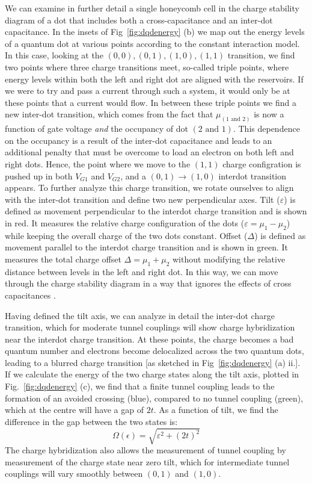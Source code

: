 We can examine in further detail a single honeycomb cell in the charge stability diagram of a dot that includes both a cross-capacitance and an inter-dot capacitance.
In the insets of Fig~\ref{fig:dqdenergy} (b) we map out the energy levels of a quantum dot at various points according to the constant interaction model.
In this case, looking at the $(0, 0), (0, 1), (1, 0), (1, 1)$ transition, we find two points where
three charge transitions meet, so-called triple points, where energy levels within both the left and right dot are aligned
with the reservoirs. If we were to try and pass a current through such a system, it would only be at these points that a
current would flow. In between these triple points we find a new inter-dot transition, which comes from the fact that $\mu_{(1 \textrm{~and~} 2)}$
is now a function of gate voltage \emph{and} the occupancy of dot $(2 \textrm{~and~} 1)$. This dependence on the
occupancy is a result of the inter-dot capacitance and leads to an additional penalty that must be
overcome to load an electron on both left and right dots. Hence, the point where we move to the $(1, 1)$ charge configration is
pushed up in both $V_{G1}$ and $V_{G2}$, and a $(0, 1) \rightarrow (1, 0)$ interdot transition appears. To further analyze this charge transition,
we rotate ourselves to align with the inter-dot transition and define two new perpendicular axes.
Tilt ($\varepsilon$) is defined as movement perpendicular to the interdot charge transition and is shown in red. It measures the relative
charge configuration of the dots ($\varepsilon = \mu_1 - \mu_2$) while keeping the overall charge of the two dots constant.
Offset ($\Delta$) is defined as movement parallel to the interdot charge transition and is shown in green.
It measures the total charge offset $\Delta = \mu_1 + \mu_2$ without modifying the relative distance between levels in the left
and right dot. In this way, we can move through the charge stability diagram in a way that ignores the effects of cross capacitances \cite{qubyte}.

Having defined the tilt axis, we can analyze in detail the inter-dot charge transition, which for moderate tunnel couplings will show
charge hybridization near the interdot charge transition. At these points, the charge becomes a bad quantum number and electrons become delocalized
across the two quantum dots, leading to a blurred charge transition [as sketched in Fig~\ref{fig:dqdenergy} (a) ii.]. If we calculate the energy
of the two charge states along the tilt axis, plotted in Fig.~\ref{fig:dqdenergy} (c), we find that a finite tunnel coupling leads to the
formation of an avoided crossing (blue), compared to no tunnel coupling (green), which at the centre will have a gap of $2t$. As a function of
tilt, we find the difference in the gap between the two states is:
\begin{equation}
  \Omega(\epsilon) = \sqrt{\varepsilon^2 + (2 t)^2}
\end{equation}
The charge hybridization also allows the measurement of tunnel coupling by measurement of the charge state near zero tilt,
which for intermediate tunnel couplings will vary smoothly between $(0, 1)$ and $(1, 0)$\cite{PhysRevLett.92.226801}.


